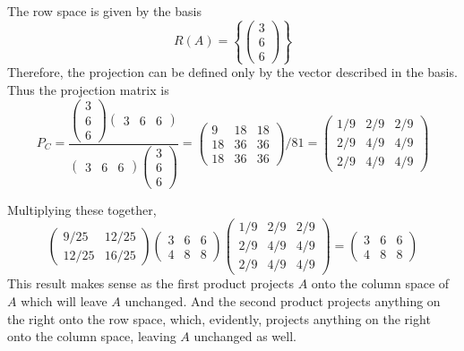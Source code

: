 \documentclass{article}
\begin{document}
The row space is given by the basis
$$ R(A) = \left\{ \begin{pmatrix}
    3 \\
    6 \\
    6
\end{pmatrix} \right\} $$
Therefore, the projection can be defined only by the vector described in the
basis. Thus the projection matrix is
$$ P_C = \frac{\begin{pmatrix} 3 \\ 6 \\ 6 \end{pmatrix} \begin{pmatrix} 3 &
6 & 6 \end{pmatrix}}{\begin{pmatrix} 3 & 6 & 6 \end{pmatrix} \begin{pmatrix} 3 \\
6 \\ 6 \end{pmatrix}} = \begin{pmatrix}
    9 & 18 & 18 \\
    18 & 36 & 36 \\
    18 & 36 & 36
\end{pmatrix} / 81 = \begin{pmatrix}
    1/9 & 2/9 & 2/9 \\
    2/9 & 4/9 & 4/9 \\
    2/9 & 4/9 & 4/9
\end{pmatrix} $$

Multiplying these together,
$$ \begin{pmatrix}
    9/25 & 12/25 \\
    12/25 & 16/25
\end{pmatrix} \begin{pmatrix}
    3 & 6 & 6 \\
    4 & 8 & 8
\end{pmatrix} \begin{pmatrix}
    1/9 & 2/9 & 2/9 \\
    2/9 & 4/9 & 4/9 \\
    2/9 & 4/9 & 4/9
\end{pmatrix} = \begin{pmatrix}
    3 & 6 & 6 \\
    4 & 8 & 8
\end{pmatrix} $$
This result makes sense as the first product projects $A$ onto the column
space of $A$ which will leave $A$ unchanged. And the second product projects
anything on the right onto the row space, which, evidently, projects anything
on the right onto the column space, leaving $A$ unchanged as well.
\end{document}
